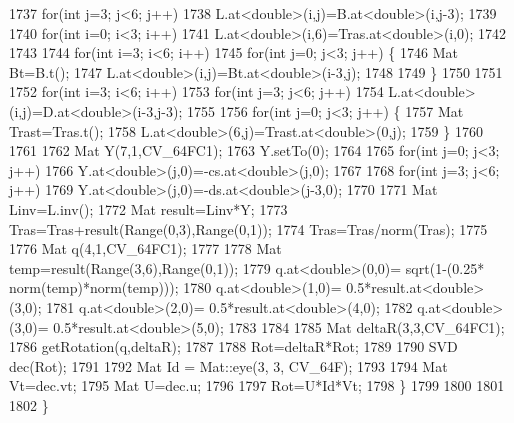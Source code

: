 \begin{DoxyCode}
1737             \textcolor{keywordflow}{for}(\textcolor{keywordtype}{int} j=3; j<6; j++)
1738                 L.at<\textcolor{keywordtype}{double}>(i,j)=B.at<\textcolor{keywordtype}{double}>(i,j-3);
1739 
1740         \textcolor{keywordflow}{for}(\textcolor{keywordtype}{int} i=0; i<3; i++)
1741             L.at<\textcolor{keywordtype}{double}>(i,6)=Tras.at<\textcolor{keywordtype}{double}>(i,0);
1742 
1743 
1744         \textcolor{keywordflow}{for}(\textcolor{keywordtype}{int} i=3; i<6; i++)
1745             \textcolor{keywordflow}{for}(\textcolor{keywordtype}{int} j=0; j<3; j++) \{
1746                 Mat Bt=B.t();
1747                 L.at<\textcolor{keywordtype}{double}>(i,j)=Bt.at<\textcolor{keywordtype}{double}>(i-3,j);
1748 
1749             \}
1750 
1751 
1752         \textcolor{keywordflow}{for}(\textcolor{keywordtype}{int} i=3; i<6; i++)
1753             \textcolor{keywordflow}{for}(\textcolor{keywordtype}{int} j=3; j<6; j++)
1754                 L.at<\textcolor{keywordtype}{double}>(i,j)=D.at<\textcolor{keywordtype}{double}>(i-3,j-3);
1755 
1756         \textcolor{keywordflow}{for}(\textcolor{keywordtype}{int} j=0; j<3; j++) \{
1757             Mat Trast=Tras.t();
1758             L.at<\textcolor{keywordtype}{double}>(6,j)=Trast.at<\textcolor{keywordtype}{double}>(0,j);
1759         \}
1760 
1761 
1762         Mat Y(7,1,CV\_64FC1);
1763         Y.setTo(0);
1764 
1765         \textcolor{keywordflow}{for}(\textcolor{keywordtype}{int} j=0; j<3; j++)
1766             Y.at<\textcolor{keywordtype}{double}>(j,0)=-cs.at<\textcolor{keywordtype}{double}>(j,0);
1767 
1768         \textcolor{keywordflow}{for}(\textcolor{keywordtype}{int} j=3; j<6; j++)
1769             Y.at<\textcolor{keywordtype}{double}>(j,0)=-ds.at<\textcolor{keywordtype}{double}>(j-3,0);
1770 
1771         Mat Linv=L.inv();
1772         Mat result=Linv*Y;
1773         Tras=Tras+result(Range(0,3),Range(0,1));
1774         Tras=Tras/norm(Tras);
1775 
1776         Mat q(4,1,CV\_64FC1);
1777 
1778         Mat temp=result(Range(3,6),Range(0,1));
1779         q.at<\textcolor{keywordtype}{double}>(0,0)= sqrt(1-(0.25* norm(temp)*norm(temp)));
1780         q.at<\textcolor{keywordtype}{double}>(1,0)= 0.5*result.at<\textcolor{keywordtype}{double}>(3,0);
1781         q.at<\textcolor{keywordtype}{double}>(2,0)= 0.5*result.at<\textcolor{keywordtype}{double}>(4,0);
1782         q.at<\textcolor{keywordtype}{double}>(3,0)= 0.5*result.at<\textcolor{keywordtype}{double}>(5,0);
1783 
1784 
1785         Mat deltaR(3,3,CV\_64FC1);
1786         getRotation(q,deltaR);
1787 
1788         Rot=deltaR*Rot;
1789 
1790         SVD dec(Rot);
1791 
1792         Mat Id = Mat::eye(3, 3, CV\_64F);
1793 
1794         Mat Vt=dec.vt;
1795         Mat U=dec.u;
1796 
1797         Rot=U*Id*Vt;
1798     \}
1799 
1800 
1801 
1802 \}
\end{DoxyCode}
